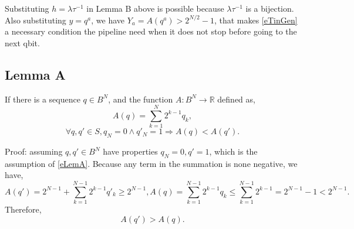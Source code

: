 \documentclass[a4paper]{article}
\newcommand{\eqlabel}[1]{\label{#1}}
\newcommand{\sR}{\mathbb{R}}
\begin{document}
Substituting \(h = \lambda\tau^{-1}\) in Lemma B above is possible because \(\lambda\tau^{-1}\) is a bijection. Also substituting \(y = q^a\), we have \(Y_a = A(q^a) > 2^{N/2}-1\), that makes \eqref{eTinGen} a necessary condition the pipeline need when it does not stop before going to the next qbit.
\subsection{Lemma A}
\label{slemmaA}

If there is a sequence \(q\in B^N\), and the function \(A: B^N \to \sR\) defined as,
\[
    A(q) = \sum_{k=1}^N 2^{k-1}q_k,
\]
\begin{equation}
    \eqlabel{eLemA}
\forall q, q'\in S, q_N=0\land q'_N=1\Rightarrow A(q) < A(q').
\end{equation}

Proof: assuming \(q, q'\in B^N\) have properties \(q_N=0, q'=1\), which is the assumption of \eqref{eLemA}. Because any term in the summation is none negative, we have,
\[
 A(q') = 2^{N-1} + \sum_{k=1}^{N-1} 2^{k-1}q'_k \geq 2^{N-1}, A(q) = \sum_{k=1}^{N-1} 2^{k-1} q_k \leq  \sum_{k=1}^{N-1} 2^{k-1} =  2^{N-1} - 1 < 2^{N-1}.
\]
Therefore,
\[
A(q') > A(q).
\]
\end{document}
